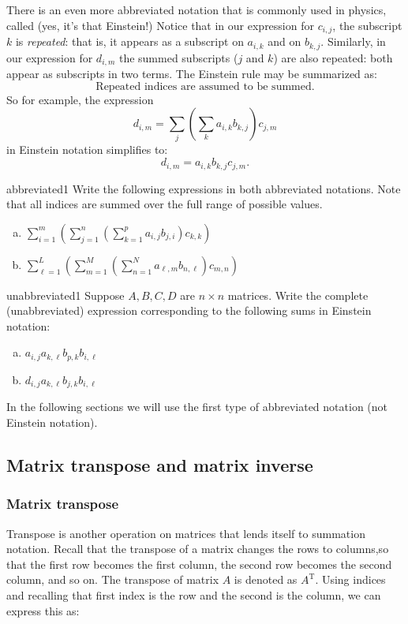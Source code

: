 There is an even more abbreviated notation that is commonly used in physics, called   (yes, it's that Einstein!) Notice that in our expression for ${c}_{i,j}$, the subscript $k$ is \emph{repeated}: that is, it appears as a subscript on $a_{i,k}$ and on  $b_{k,j}$. Similarly, in our expression for ${d}_{i,m}$  the summed subscripts ($j$ and $k$) are also repeated: both appear as subscripts in two terms. The Einstein rule may be summarized as:
\[ \text{Repeated indices are assumed to be summed.} \] 
So for example, the expression
\[ {d}_{i,m}= \sum_{j} \left( \sum_{k} a_{i,k} b_{k,j} \right) c_{j,m} \]
in  Einstein notation simplifies to:
\[ {d}_{i,m}=  a_{i,k} b_{k,j} c_{j,m}. \]

\begin{exercise}{abbreviated1}
Write the following expressions in both abbreviated notations. Note that all indices are summed over the full range of possible values.
\begin{enumerate}[(a)]
\item
$\sum_{i=1}^m \left( \sum_{j=1}^n \left( \sum_{k=1}^p  a_{i,j} b_{j,i} \right) c_{k,k}\right)$
\item
$\sum_{\ell=1}^L \left( \sum_{m=1}^M \left( \sum_{n=1}^N  a_{\ell,m} b_{n,\ell} \right) c_{m,n} \right)$
\end{enumerate}
\end{exercise}

\begin{exercise}{unabbreviated1}
Suppose $A,B,C,D$ are $n \times n$ matrices.  Write the complete (unabbreviated) expression corresponding to the following sums in Einstein notation:
\begin{enumerate}[(a)]
\item
$a_{i,j}a_{k,\ell}b_{p,k}b_{i,\ell}$
\item
$d_{i,j}a_{k,\ell}b_{j,k}b_{i,\ell}$
\end{enumerate}
\end{exercise}

In the following sections we will use the first type of abbreviated notation (not Einstein notation).


\subsection{Matrix transpose and matrix inverse}

\subsubsection*{Matrix transpose}
Transpose is another operation on matrices that lends itself to summation notation.  Recall that the transpose of a matrix changes the rows to columns,so that the first row becomes the first column, the second row becomes the second column, and so on.  The transpose of matrix $A$ is denoted as $A^{\text{T}}$. Using indices and recalling that first index is the row and the second is the column, we can express this as:

